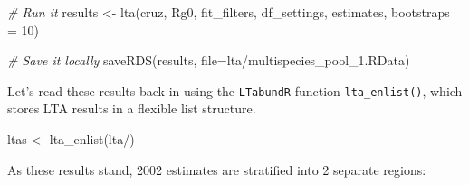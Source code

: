 \documentclass[
]{book}
\newenvironment{Shaded}{\begin{snugshade}}{\end{snugshade}}
\newcommand{\AttributeTok}[1]{\textcolor[rgb]{0.77,0.63,0.00}{#1}}
\newcommand{\CommentTok}[1]{\textcolor[rgb]{0.56,0.35,0.01}{\textit{#1}}}
\newcommand{\ConstantTok}[1]{\textcolor[rgb]{0.00,0.00,0.00}{#1}}
\newcommand{\DecValTok}[1]{\textcolor[rgb]{0.00,0.00,0.81}{#1}}
\newcommand{\FloatTok}[1]{\textcolor[rgb]{0.00,0.00,0.81}{#1}}
\newcommand{\FunctionTok}[1]{\textcolor[rgb]{0.00,0.00,0.00}{#1}}
\newcommand{\NormalTok}[1]{#1}
\newcommand{\OtherTok}[1]{\textcolor[rgb]{0.56,0.35,0.01}{#1}}
\newcommand{\SpecialCharTok}[1]{\textcolor[rgb]{0.00,0.00,0.00}{#1}}
\newcommand{\StringTok}[1]{\textcolor[rgb]{0.31,0.60,0.02}{#1}}
\begin{document}
\begin{Shaded}
\begin{Highlighting}[]
\CommentTok{\# Run it}
\NormalTok{results }\OtherTok{\textless{}{-}} \FunctionTok{lta}\NormalTok{(cruz, Rg0, }
\NormalTok{               fit\_filters, df\_settings, estimates, }
               \AttributeTok{bootstraps =} \DecValTok{10}\NormalTok{)}

\CommentTok{\# Save it locally}
\FunctionTok{saveRDS}\NormalTok{(results, }\AttributeTok{file=}\StringTok{\textquotesingle{}lta/multispecies\_pool\_1.RData\textquotesingle{}}\NormalTok{)}
\end{Highlighting}
\end{Shaded}

Let's read these results back in using the \texttt{LTabundR} function \texttt{lta\_enlist()}, which stores LTA results in a flexible list structure.

\begin{Shaded}
\begin{Highlighting}[]
\NormalTok{ltas }\OtherTok{\textless{}{-}} \FunctionTok{lta\_enlist}\NormalTok{(}\StringTok{\textquotesingle{}lta/\textquotesingle{}}\NormalTok{)}
\end{Highlighting}
\end{Shaded}

As these results stand, 2002 estimates are stratified into 2 separate regions:

\begin{Shaded}
\end{Shaded}
\end{document}
